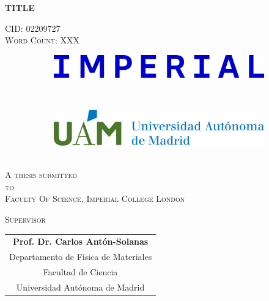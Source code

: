 \begin{center}

{\Large \textbf{TITLE } \\[\stretch{2}]}


\textsc{CID: 02209727 \\ Word Count: XXX}\\[\stretch{2}]

\begin{figure}[hb!t]
     \centering
     \begin{subfigure}[b]{0.5\textwidth}
         \centering
         \includegraphics[width=\textwidth]{Title/ICL_Logo.jpg}
     \end{subfigure}
     ~\\[1 cm]
     \begin{subfigure}[b]{0.5\textwidth}
         \centering
         \includegraphics[width=\textwidth]{Title/UAM_Logo.jpg}
     \end{subfigure}
     \hfill
\end{figure}

~\\[1cm]

\textsc{A thesis submitted \\[1ex]
to \\[1ex]
Faculty Of Science, Imperial College London\\[\stretch{3}]}

\textsc{Supervisor}\\[2ex]

\begin{tabular}[t]{@{}c@{}}
\bfseries Prof. Dr. Carlos Antón-Solanas \\
Departamento de Física de Materiales\\
Facultad de Ciencia \\
Universidad Autónoma de Madrid
\end{tabular}\hfil


\end{center}

\newpage



